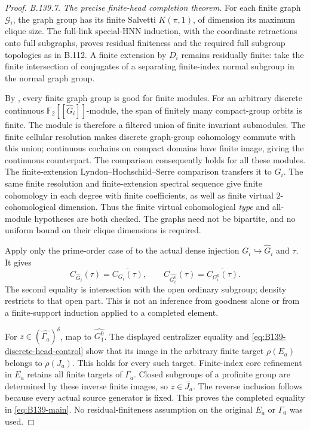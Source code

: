 \begin{proof}
\emph{B.139.7. The precise finite-head completion theorem.}
For each finite graph $\mathcal G_i$, the graph group has its
finite Salvetti $K(\pi,1)$, of dimension its maximum clique size.
The full-link special-HNN induction, with the coordinate
retractions onto full subgraphs, proves residual finiteness
and the required full subgroup topologies as in B.112.
A finite extension by $D_i$ remains residually finite:
take the finite intersection of conjugates of a separating
finite-index normal subgroup in the normal graph group.

By \citet[Theorem~3.15 and its complete local dependencies
3.10--3.14]{B_Lorensen2008}, every finite graph group is good
for finite modules. For an arbitrary discrete continuous
$\mathbb F_2[[\widehat G_i]]$-module, the span of finitely many
compact-group orbits is finite. The module is therefore a
filtered union of finite invariant submodules.
The finite cellular resolution makes discrete graph-group
cohomology commute with this union; continuous cochains on
compact domains have finite image, giving the continuous
counterpart. The comparison consequently holds for all these
modules. The finite-extension Lyndon--Hochschild--Serre
comparison transfers it to $G_i$.
The same finite resolution and finite-extension spectral
sequence give finite cohomology in each degree with finite
coefficients, as well as finite virtual $2$-cohomological
dimension. Thus the finite virtual cohomological \emph{type}
and all-module hypotheses are both checked.
The graphs need not be bipartite, and no uniform bound on their
clique dimensions is required.

Apply only the prime-order case of
\citet[Theorem~4.3, Lemma~4.4, Section~4.2 and Lemma~2.2]
{BoggiZalesskii2025} to the actual dense injection
$G_i\hookrightarrow\widehat G_i$ and $\tau$.
It gives
\[
 C_{\widehat G_i}(\tau)=\overline{C_{G_i}(\tau)},\qquad
 C_{\widehat{G_i^0}}(\tau)=\overline{C_{G_i^0}(\tau)}.
\]
The second equality is intersection with the open ordinary
subgroup; density restricts to that open part.
This is not an inference from goodness alone or from a
finite-support induction applied to a completed element.

For $z\in(\widehat{\Gamma_a})^\delta$, map to
$\widehat{G_1^0}$. The displayed centralizer equality and
\eqref{eq:B139-discrete-head-control} show that its image
in the arbitrary finite target $\rho(E_a)$ belongs to
$\rho(J_a)$. This holds for every such target.
Finite-index core refinement in $E_a$ retains all finite
targets of $\Gamma_a$. Closed subgroups of a profinite group
are determined by these inverse finite images, so
$z\in\overline{J_a}$. The reverse inclusion follows because
every actual source generator is fixed.
This proves the completed equality in \eqref{eq:B139-main}.
No residual-finiteness assumption on the original $E_a$
or $\Gamma_0$ was used.


\end{proof}
